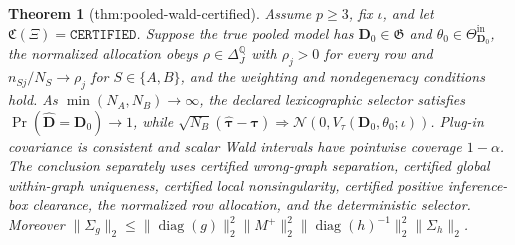\documentclass{article}
\newtheorem{theorem}{Theorem}
\begin{document}
\begin{theorem}[thm:pooled-wald-certified]\label{thm:pooled-wald-certified}
Assume \(p\geq3\), fix \(\iota\), and let \(\mathfrak C(\Xi)=\mathtt{CERTIFIED}\). Suppose the true pooled model has \(\boldsymbol D_0\in\mathfrak G\) and \(\theta_0\in\Theta^{\mathrm{in}}_{\boldsymbol D_0}\), the normalized allocation obeys \(\rho\in\Delta_J^{\mathbb Q}\) with \(\rho_j>0\) for every row and \(n_{Sj}/N_S\to\rho_j\) for \(S\in\{A,B\}\), and the weighting and nondegeneracy conditions hold. As \(\min(N_A,N_B)\to\infty\), the declared lexicographic selector satisfies \(\Pr(\widehat{\boldsymbol D}=\boldsymbol D_0)\to1\), while \(\sqrt{N_B}(\widehat{\boldsymbol\tau}-\boldsymbol\tau)\Rightarrow\mathcal N(0,V_\tau(\boldsymbol D_0,\theta_0;\iota))\). Plug-in covariance is consistent and scalar Wald intervals have pointwise coverage \(1-\alpha\). The conclusion separately uses certified wrong-graph separation, certified global within-graph uniqueness, certified local nonsingularity, certified positive inference-box clearance, the normalized row allocation, and the deterministic selector. Moreover \(\lVert\Sigma_g\rVert_2\leq\lVert\operatorname{diag}(g)\rVert_2^2\lVert M^+\rVert_2^2\lVert\operatorname{diag}(h)^{-1}\rVert_2^2\lVert\Sigma_h\rVert_2\).
\end{theorem}
\end{document}
